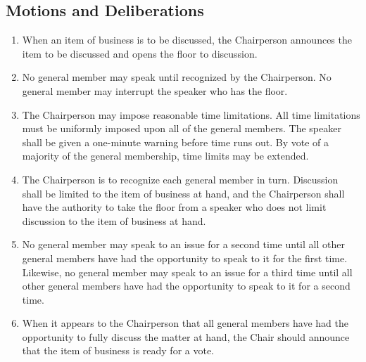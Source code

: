 \documentclass[12pt]{article}
\begin{document}
\subsection{Motions and Deliberations}
\begin{enumerate}[{A.7}.1]
    \item	When an item of business is to be discussed, the Chairperson announces the item to be discussed and opens the floor to discussion. 
    \item	No general member may speak until recognized by the Chairperson. No general member may interrupt the speaker who has the floor.
    \item	The Chairperson may impose reasonable time limitations. All time limitations must be uniformly imposed upon all of the general members. The speaker shall be given a one-minute warning before time runs out.  By vote of a majority of the general membership, time limits may be extended.
    \item	The Chairperson is to recognize each general member in turn. Discussion shall be limited to the item of business at hand, and the Chairperson shall have the authority to take the floor from a speaker who does not limit discussion to the item of business at hand.  
    \item	No general member may speak to an issue for a second time until all other general members have had the opportunity to speak to it for the first time. Likewise, no general member may speak to an issue for a third time until all other general members have had the opportunity to speak to it for a second time.
    \item	When it appears to the Chairperson that all general members have had the opportunity to fully discuss the matter at hand, the Chair should announce that the item of business is ready for a vote.
\end{enumerate}


\end{document}
